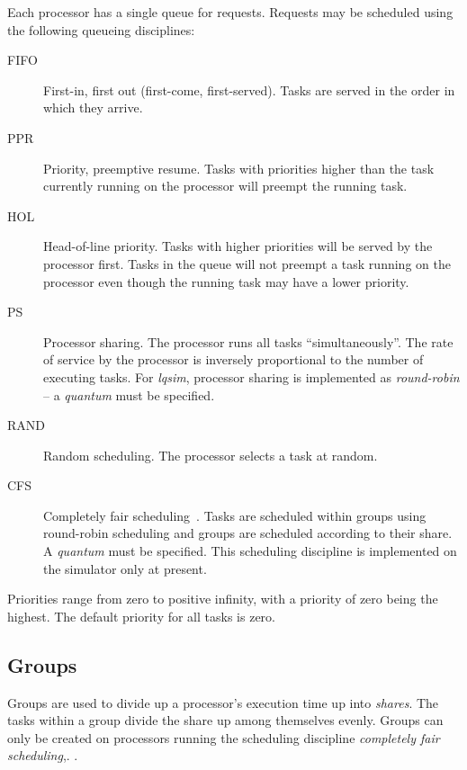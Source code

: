 Each processor has a single queue for requests.  Requests may be
scheduled using the following queueing disciplines:
\begin{description}
\item[FIFO] First-in, first out (first-come,
  first-served).  Tasks are served in the order in which they arrive.
\item[PPR] Priority, preemptive
  resume.  Tasks with
  priorities
  higher than the task currently running on the processor will preempt
  the running task.
\item[HOL] Head-of-line priority.  Tasks
  with higher priorities will be served by the processor first.  Tasks
  in the queue will not preempt a task running on the processor even
  though the running task may have a lower priority.
\item[PS] Processor sharing.  The processor
  runs all tasks ``simultaneously''.  The rate of service by the
  processor is inversely proportional to the number of executing
  tasks.  For \emph{lqsim}, processor
  sharing is implemented as
  \emph{round-robin}
  -- a \emph{quantum} must be specified.
\item[RAND] Random scheduling.  The processor selects a task at random. 
\item[CFS] Completely fair scheduling~\cite{perf:li-2009-mascots-fairshare}.  Tasks are scheduled within groups using
  round-robin scheduling and groups are scheduled according to their share.  A
  \emph{quantum} must be specified.  This scheduling discipline is implemented on the
  simulator only at present.
\end{description}

Priorities range from zero to positive
infinity, with a priority of zero being the highest.  The default
priority for all tasks is zero.

\subsection{Groups}
\label{sec:groups}

Groups\cite{perf:li-2009-mascots-fairshare} are used to divide up a processor's
execution time up into \emph{shares}.  The tasks within a group divide the share up among
themselves evenly.  Groups can only be created on processors running the scheduling discipline
\emph{completely fair scheduling},.  .

